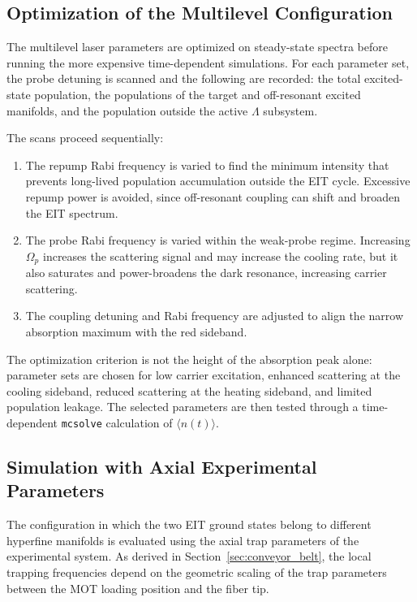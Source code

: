 \subsection{Optimization of the Multilevel Configuration}
\label{subsec:multilevel_optimization}

The multilevel laser parameters are optimized on steady-state spectra before running the more expensive time-dependent simulations. For each parameter set, the probe detuning is scanned and the following are recorded: the total excited-state population, the populations of the target and off-resonant excited manifolds, and the population outside the active $\Lambda$ subsystem.

The scans proceed sequentially:
\begin{enumerate}
    \item The repump Rabi frequency is varied to find the minimum intensity that prevents long-lived population accumulation outside the EIT cycle. Excessive repump power is avoided, since off-resonant coupling can shift and broaden the EIT spectrum.

    \item The probe Rabi frequency is varied within the weak-probe regime. Increasing $\Omega_p$ increases the scattering signal and may increase the cooling rate, but it also saturates and power-broadens the dark resonance, increasing carrier scattering.

    \item The coupling detuning and Rabi frequency are adjusted to align the narrow absorption maximum with the red sideband.
\end{enumerate}

The optimization criterion is not the height of the absorption peak alone: parameter sets are chosen for low carrier excitation, enhanced scattering at the cooling sideband, reduced scattering at the heating sideband, and limited population leakage. The selected parameters are then tested through a time-dependent \texttt{mcsolve} calculation of $\langle n(t)\rangle$.

\subsection{Simulation with Axial Experimental Parameters}
\label{subsec:axial_simulation}

The configuration in which the two EIT ground states belong to different hyperfine manifolds is evaluated using the axial trap parameters of the experimental system. As derived in Section~\ref{sec:conveyor_belt}, the local trapping frequencies depend on the geometric scaling of the trap parameters between the MOT loading position and the fiber tip.

